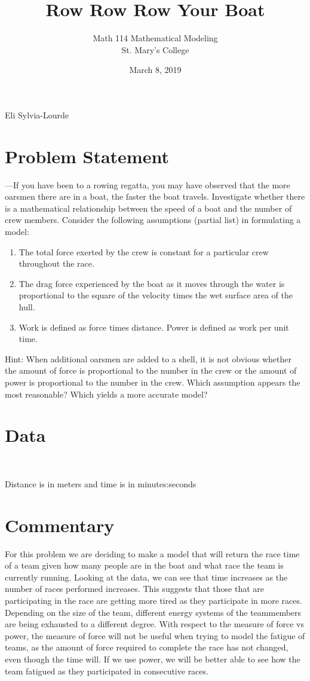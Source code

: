 \documentclass[12pt]{article} %
\title{Row Row Row Your Boat}
\author{Math 114 Mathematical Modeling\\St. Mary's College}
\date{March 8, 2019}
\newcommand{\authors}{Eli Sylvia-Lourde}
\begin{document}
\hfill\authors %
{\let\newpage\relax\maketitle} %

\section*{Problem Statement}
—If you have been to a rowing regatta, you may have observed that the more oarsmen there are in a boat, the faster the boat travels. Investigate whether there is a mathematical relationship between the speed of a boat and the number of crew members. Consider the following assumptions (partial list) in formulating a model:

\begin{enumerate}
\item
The total force exerted by the crew is constant for a particular crew throughout the race.
\item
The drag force experienced by the boat as it moves through the water is proportional to the square of the velocity times the wet surface area of the hull.
\item
Work is defined as force times distance. Power is defined as work per unit time.
\end{enumerate}
Hint: When additional oarsmen are added to a shell, it is not obvious whether the amount of force is proportional to the number in the crew or the amount of power is proportional to the number in the crew. Which assumption appears the most reasonable? Which yields a more accurate model?

\section*{Data}
{\centering
{}
\\}

Distance is in meters and time is in minutes:seconds

\section*{Commentary}

For this problem we are deciding to make a model that will return the race time of a team given how many people are in the boat and what race the team is currently running. Looking at the data, we can see that time increases as the number of races performed increases. This suggests that those that are participating in the race are getting more tired as they participate in more races. Depending on the size of the team, different energy systems of the teammembers are being exhausted to a different degree. With respect to the measure of force vs power, the measure of force will not be useful when trying to model the fatigue of teams, as the amount of force required to complete the race has not changed, even though the time will. If we use power, we will be better able to see how the team fatigued as they participated in consecutive races.
\end{document}
